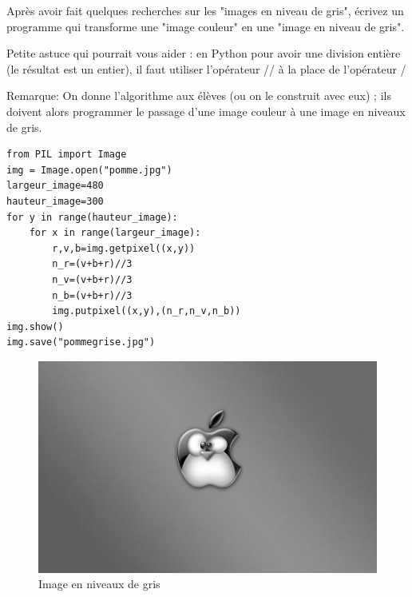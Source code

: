 \documentclass[11pt]{article}
\begin{document}
Après avoir fait quelques recherches sur les "images en niveau de gris", écrivez un programme qui transforme une "image couleur" en une "image en niveau de gris".

Petite astuce qui pourrait vous aider : en Python pour avoir une division entière (le résultat est un entier), il faut utiliser l'opérateur // à la place de l'opérateur / 

Remarque: On donne l'algorithme aux élèves (ou on le construit avec eux) ; ils doivent alors programmer le passage d'une image couleur à une image en niveaux de gris.


\begin{verbatim}
from PIL import Image
img = Image.open("pomme.jpg")
largeur_image=480
hauteur_image=300
for y in range(hauteur_image):
    for x in range(largeur_image):
        r,v,b=img.getpixel((x,y))
        n_r=(v+b+r)//3
        n_v=(v+b+r)//3
        n_b=(v+b+r)//3
        img.putpixel((x,y),(n_r,n_v,n_b))
img.show()
img.save("pommegrise.jpg")
\end{verbatim}

\begin{figure}[htbp]
\centering
\includegraphics[width=.9\linewidth]{pommegrise.jpg}
\caption{Image en niveaux de gris}
\end{figure}
\end{document}
